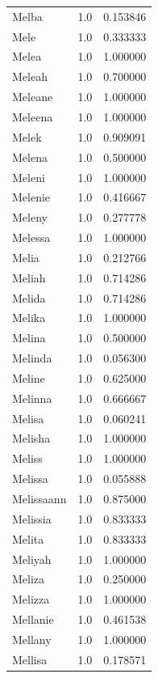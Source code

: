 \documentclass[
  letterpaper,
  DIV=11,
  numbers=noendperiod]{scrreprt}
\begin{document}
\begin{tabular}{lrr}
Melba           &   1.0 &   0.153846 \\
Mele            &   1.0 &   0.333333 \\
Melea           &   1.0 &   1.000000 \\
Meleah          &   1.0 &   0.700000 \\
Meleane         &   1.0 &   1.000000 \\
Meleena         &   1.0 &   1.000000 \\
Melek           &   1.0 &   0.909091 \\
Melena          &   1.0 &   0.500000 \\
Meleni          &   1.0 &   1.000000 \\
Melenie         &   1.0 &   0.416667 \\
Meleny          &   1.0 &   0.277778 \\
Melessa         &   1.0 &   1.000000 \\
Melia           &   1.0 &   0.212766 \\
Meliah          &   1.0 &   0.714286 \\
Melida          &   1.0 &   0.714286 \\
Melika          &   1.0 &   1.000000 \\
Melina          &   1.0 &   0.500000 \\
Melinda         &   1.0 &   0.056300 \\
Meline          &   1.0 &   0.625000 \\
Melinna         &   1.0 &   0.666667 \\
Melisa          &   1.0 &   0.060241 \\
Melisha         &   1.0 &   1.000000 \\
Meliss          &   1.0 &   1.000000 \\
Melissa         &   1.0 &   0.055888 \\
Melissaann      &   1.0 &   0.875000 \\
Melissia        &   1.0 &   0.833333 \\
Melita          &   1.0 &   0.833333 \\
Meliyah         &   1.0 &   1.000000 \\
Meliza          &   1.0 &   0.250000 \\
Melizza         &   1.0 &   1.000000 \\
Mellanie        &   1.0 &   0.461538 \\
Mellany         &   1.0 &   1.000000 \\
Mellisa         &   1.0 &   0.178571 \\

\end{tabular}
\end{document}
